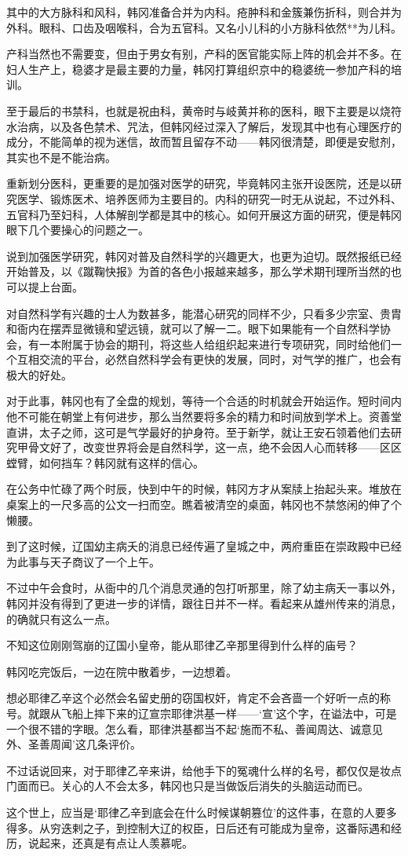 其中的大方脉科和风科，韩冈准备合并为内科。疮肿科和金簇兼伤折科，则合并为外科。眼科、口齿及咽喉科，合为五官科。又名小儿科的小方脉科依然**为儿科。

产科当然也不需要变，但由于男女有别，产科的医官能实际上阵的机会并不多。在妇人生产上，稳婆才是最主要的力量，韩冈打算组织京中的稳婆统一参加产科的培训。

至于最后的书禁科，也就是祝由科，黄帝时与岐黄并称的医科，眼下主要是以烧符水治病，以及各色禁术、咒法，但韩冈经过深入了解后，发现其中也有心理医疗的成分，不能简单的视为迷信，故而暂且留存不动——韩冈很清楚，即便是安慰剂，其实也不是不能治病。

重新划分医科，更重要的是加强对医学的研究，毕竟韩冈主张开设医院，还是以研究医学、锻炼医术、培养医师为主要目的。内科的研究一时无从说起，不过外科、五官科乃至妇科，人体解剖学都是其中的核心。如何开展这方面的研究，便是韩冈眼下几个要操心的问题之一。

说到加强医学研究，韩冈对普及自然科学的兴趣更大，也更为迫切。既然报纸已经开始普及，以《蹴鞠快报》为首的各色小报越来越多，那么学术期刊理所当然的也可以提上台面。

对自然科学有兴趣的士人为数甚多，能潜心研究的同样不少，只看多少宗室、贵胄和衙内在摆弄显微镜和望远镜，就可以了解一二。眼下如果能有一个自然科学协会，有一本附属于协会的期刊，将这些人给组织起来进行专项研究，同时给他们一个互相交流的平台，必然自然科学会有更快的发展，同时，对气学的推广，也会有极大的好处。

对于此事，韩冈也有了全盘的规划，等待一个合适的时机就会开始运作。短时间内他不可能在朝堂上有何进步，那么当然要将多余的精力和时间放到学术上。资善堂直讲，太子之师，这可是气学最好的护身符。至于新学，就让王安石领着他们去研究甲骨文好了，改变世界将会是自然科学，这一点，绝不会因人心而转移——区区螳臂，如何挡车？韩冈就有这样的信心。

在公务中忙碌了两个时辰，快到中午的时候，韩冈方才从案牍上抬起头来。堆放在桌案上的一尺多高的公文一扫而空。瞧着被清空的桌面，韩冈也不禁悠闲的伸了个懒腰。

到了这时候，辽国幼主病夭的消息已经传遍了皇城之中，两府重臣在崇政殿中已经为此事与天子商议了一个上午。

不过中午会食时，从衙中的几个消息灵通的包打听那里，除了幼主病夭一事以外，韩冈并没有得到了更进一步的详情，跟往日并不一样。看起来从雄州传来的消息，的确就只有这么一点。

不知这位刚刚驾崩的辽国小皇帝，能从耶律乙辛那里得到什么样的庙号？

韩冈吃完饭后，一边在院中散着步，一边想着。

想必耶律乙辛这个必然会名留史册的窃国权奸，肯定不会吝啬一个好听一点的称号。就跟从飞船上摔下来的辽宣宗耶律洪基一样——‘宣’这个字，在谥法中，可是一个很不错的字眼。怎么看，耶律洪基都当不起‘施而不私、善闻周达、诚意见外、圣善周闻’这几条评价。

不过话说回来，对于耶律乙辛来讲，给他手下的冤魂什么样的名号，都仅仅是妆点门面而已。关心的人不会太多，韩冈也只是当做饭后消失的头脑运动而已。

这个世上，应当是‘耶律乙辛到底会在什么时候谋朝篡位’的这件事，在意的人要多得多。从穷迭剌之子，到控制大辽的权臣，日后还有可能成为皇帝，这番际遇和经历，说起来，还真是有点让人羡慕呢。

